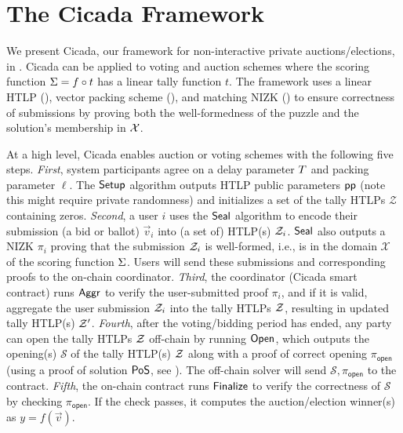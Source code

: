 \section{The Cicada Framework}

We present Cicada, our framework for non-interactive private auctions/elections, in . Cicada can be applied to voting and auction schemes where the scoring function $\Sigma = f \circ t$ has a linear tally function $t$. The framework uses a linear HTLP (), vector packing scheme (), and matching NIZK () to ensure correctness of submissions by proving both the well-formedness of the puzzle and the solution's membership in $\mathcal{X}$.

At a high level, Cicada enables auction or voting schemes with the following five steps. 
\emph{First}, system participants agree on a delay parameter $T$ and packing parameter $\ell$. The $\mathsf{Setup}$ algorithm outputs HTLP public parameters $\mathsf{pp}$ (note this might require private randomness) and initializes a set of the tally HTLPs $\mathcal{Z}$ containing zeros. 
\emph{Second}, a user $i$ uses the $\mathsf{Seal}$ algorithm to encode their submission (a bid or ballot) $\vec{v}_i$ into (a set of) HTLP(s) $\mathcal{Z}_i$. $\mathsf{Seal}$ also outputs a NIZK $\pi_i$ proving that the submission $\mathcal{Z}_i$ is well-formed, i.e., is in the domain $\mathcal{X}$ of the scoring function $\Sigma$. Users will send these submissions and corresponding proofs to the on-chain coordinator. 
\emph{Third}, the coordinator (Cicada smart contract) runs $\mathsf{Aggr}$ to verify the user-submitted proof $\pi_i$, and if it is valid, aggregate the user submission $\mathcal{Z}_i$ into the tally HTLPs $\mathcal{Z}$, resulting in updated tally HTLP(s) $\mathcal{Z}'$. 
\emph{Fourth}, after the voting/bidding period has ended, any party can open the tally HTLPs $\mathcal{Z}$ off-chain by running $\mathsf{Open}$, which outputs the opening(s) $\mathcal{S}$ of the tally HTLP(s) $\mathcal{Z}$ along with a proof of correct opening $\pi_{\textsf{open}}$ (using a proof of solution ${\sf PoS}$, see ). The off-chain solver will send $\mathcal{S}, \pi_{\mathsf{open}}$ to the contract. 
\emph{Fifth}, the on-chain contract runs $\mathsf{Finalize}$ to verify the correctness of $\mathcal{S}$ by checking $\pi_{\mathsf{open}}$. If the check passes, it computes the auction/election winner(s) as $y=f(\vec{v})$.


